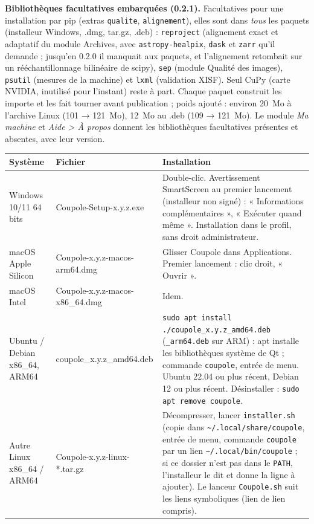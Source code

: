 \textbf{Bibliothèques facultatives embarquées (0.2.1).} Facultatives pour une installation par pip (extras
\texttt{qualite}, \texttt{alignement}), elles sont dans \emph{tous} les paquets (installeur Windows, .dmg, tar.gz,
.deb) : \texttt{reproject} (alignement exact et adaptatif du module Archives, avec \texttt{astropy-healpix},
\texttt{dask} et \texttt{zarr} qu'il demande ; jusqu'en 0.2.0 il manquait aux paquets, et l'alignement retombait sur
un rééchantillonnage bilinéaire de scipy), \texttt{sep} (module Qualité des images), \texttt{psutil} (mesures de la
machine) et \texttt{lxml} (validation XISF). Seul CuPy (carte NVIDIA, inutilisé pour l'instant) reste à part. Chaque
paquet construit les importe et les fait tourner avant publication ; poids ajouté : environ 20~Mo à l'archive Linux
(101 → 121~Mo), 12~Mo au .deb (109 → 121~Mo). Le module \emph{Ma machine} et \emph{Aide > À propos} donnent les
bibliothèques facultatives présentes et absentes, avec leur version.

\begin{center}\small
\begin{tabularx}{\linewidth}{@{}l>{\ttfamily\small}lX@{}}
\toprule
\textbf{Système} & \textbf{\normalfont Fichier} & \textbf{Installation}\\
\midrule
Windows 10/11 64 bits & Coupole-Setup-x.y.z.exe & Double-clic. Avertissement SmartScreen au premier lancement (installeur non signé) : « Informations complémentaires », « Exécuter quand même ». Installation dans le profil, sans droit administrateur.\\
macOS Apple Silicon & Coupole-x.y.z-macos-arm64.dmg & Glisser Coupole dans Applications. Premier lancement : clic droit, « Ouvrir ».\\
macOS Intel & Coupole-x.y.z-macos-x86\_64.dmg & Idem.\\
Ubuntu / Debian x86\_64, ARM64 & coupole\_x.y.z\_amd64.deb & \texttt{sudo apt install ./coupole\_x.y.z\_amd64.deb} (\texttt{\_arm64.deb} sur ARM) : apt installe les bibliothèques système de Qt ; commande \texttt{coupole}, entrée de menu. Ubuntu 22.04 ou plus récent, Debian 12 ou plus récent. Désinstaller : \texttt{sudo apt remove coupole}.\\
Autre Linux x86\_64 / ARM64 & Coupole-x.y.z-linux-*.tar.gz & Décompresser, lancer \texttt{installer.sh} (copie dans \texttt{\textasciitilde/.local/share/coupole}, entrée de menu, commande \texttt{coupole} par un lien \texttt{\textasciitilde/.local/bin/coupole} ; si ce dossier n'est pas dans le \texttt{PATH}, l'installeur le dit et donne la ligne à ajouter). Le lanceur \texttt{Coupole.sh} suit les liens symboliques (lien de lien compris).\\
\bottomrule
\end{tabularx}
\end{center}

